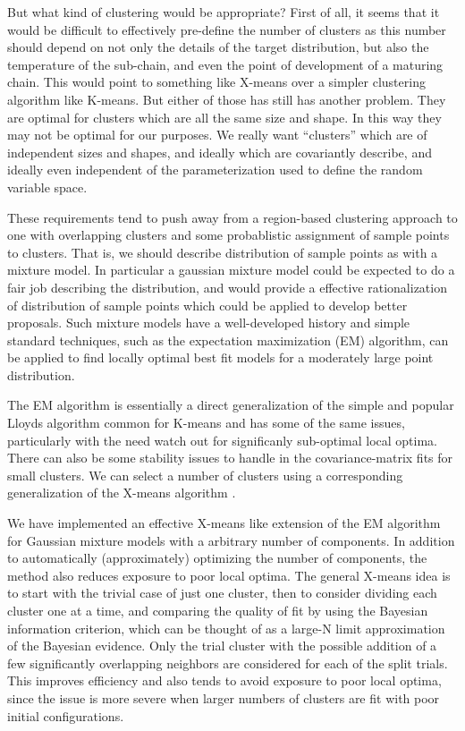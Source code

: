 \documentclass[aps,showpacs,twocolumn,prd,superscriptaddress,nofootinbib]{revtex4}
\begin{document}
But what kind of clustering would be appropriate?  First of all, it seems that it would be difficult to effectively pre-define the number of clusters as this number should depend on not only the details of the target distribution, but also the temperature of the sub-chain, and even the point of development of a maturing chain.  This would point to something like X-means over a simpler clustering algorithm like K-means.  But either of those has still has another problem.  They are optimal for clusters which are all the same size and shape.  In this way they may not be optimal for our purposes.  We really want ``clusters'' which are of independent sizes and shapes, and ideally which are covariantly describe, and ideally even independent of the parameterization used to define the random variable space. 

These requirements tend to push away from a region-based clustering approach to one with overlapping clusters and some probablistic assignment of sample points to clusters.  That is, we should describe distribution of sample points as with a mixture model.  In particular a gaussian mixture model could be expected to do a fair job describing the distribution, and would provide a effective rationalization of distribution of sample points which could be applied to develop better proposals.  Such mixture models have a well-developed history and simple standard techniques, such as the expectation maximization (EM) algorithm, can be applied to find locally optimal best fit models for a moderately large point distribution.

The EM algorithm is essentially a direct generalization of the simple and popular Lloyds algorithm common for K-means and has some of the same issues, particularly with the need watch out for significanly sub-optimal local optima. There can also be some stability issues to handle in the covariance-matrix fits for small clusters. We can select a number of clusters using a corresponding generalization of the X-means algorithm \cite{Xmeans}.

We have implemented an effective X-means like extension of the EM algorithm for Gaussian mixture models with a arbitrary number of components. In addition to automatically (approximately) optimizing the number of components, the method also reduces exposure to poor local optima.  The general X-means idea is to start with the trivial case of just one cluster, then to consider dividing each cluster one at a time, and comparing the quality of fit by using the Bayesian information criterion, which can be thought of as a large-N limit approximation of the Bayesian evidence.  Only the trial cluster with the possible addition of a few significantly overlapping neighbors are considered for each of the split trials.  This improves efficiency and also tends to avoid exposure to poor local optima, since the issue is more severe when larger numbers of clusters are fit with poor initial configurations.  
\end{document}
